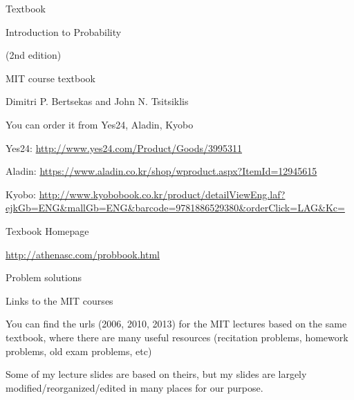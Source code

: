 \begin{frame}{Textbook}

\plitemsep 0.02in

{
\bci
\item Introduction to Probability

(2nd edition)

\bci
\item MIT course textbook
\item Dimitri P. Bertsekas and John N. Tsitsiklis
\eci

\item You can order it from Yes24, Aladin, Kyobo
\bci
\item \scriptsize Yes24: \url{http://www.yes24.com/Product/Goods/3995311}
\item \scriptsize Aladin: \url{https://www.aladin.co.kr/shop/wproduct.aspx?ItemId=12945615}
\item \scriptsize Kyobo: \url{http://www.kyobobook.co.kr/product/detailViewEng.laf?ejkGb=ENG&mallGb=ENG&barcode=9781886529380&orderClick=LAG&Kc=}
\eci
  \eci
}
{
\centering
{}
}


\end{frame}


\begin{frame}{Texbook Homepage}

  \plitemsep 0.1in
  \bci

  \item<1-> \url{http://athenasc.com/probbook.html}

  \item<2-> Problem solutions

  \item<2-> Links to the MIT courses

    \item<3-> You can find the urls (2006, 2010, 2013) for the MIT lectures
  based on the same textbook, where there are many useful resources
  (recitation problems, homework problems, old exam problems, etc)

\medskip
\item<4-> Some of my lecture slides are based on theirs, but my slides
   are largely  modified/reorganized/edited in many places for our
   purpose.

    \eci



\end{frame}

